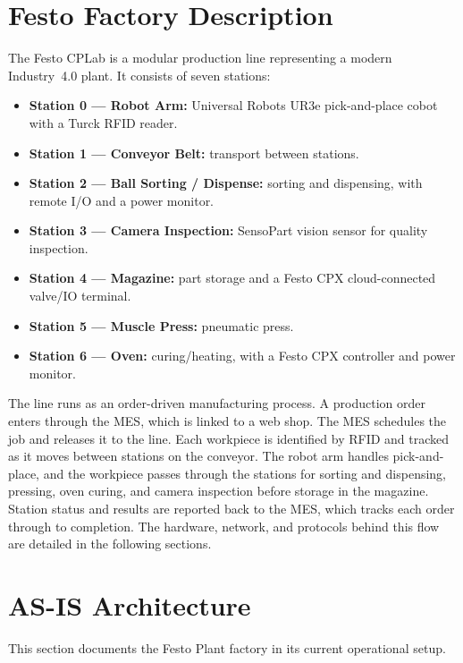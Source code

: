 \documentclass{report}
\begin{document}
\chapter{Festo Factory Description}\label{chap:2-description}

The Festo CPLab is a modular production line representing a modern Industry~4.0 plant. It consists of seven stations:

\begin{itemize}[nosep]
  \item \textbf{Station 0 --- Robot Arm:} Universal Robots UR3e pick-and-place cobot with a Turck RFID reader.
  \item \textbf{Station 1 --- Conveyor Belt:} transport between stations.
  \item \textbf{Station 2 --- Ball Sorting / Dispense:} sorting and dispensing, with remote I/O and a power monitor.
  \item \textbf{Station 3 --- Camera Inspection:} SensoPart vision sensor for quality inspection.
  \item \textbf{Station 4 --- Magazine:} part storage and a Festo CPX cloud-connected valve/IO terminal.
  \item \textbf{Station 5 --- Muscle Press:} pneumatic press.
  \item \textbf{Station 6 --- Oven:} curing/heating, with a Festo CPX controller and power monitor.
\end{itemize}

The line runs as an order-driven manufacturing process. A production order enters through the MES, which is linked to a web shop. The MES schedules the job and releases it to the line. Each workpiece is identified by RFID and tracked as it moves between stations on the conveyor. The robot arm handles pick-and-place, and the workpiece passes through the stations for sorting and dispensing, pressing, oven curing, and camera inspection before storage in the magazine. Station status and results are reported back to the MES, which tracks each order through to completion. The hardware, network, and protocols behind this flow are detailed in the following sections.

\chapter{AS-IS Architecture}\label{chap:3-currentarch}
This section documents the Festo Plant factory in its current operational setup.
\end{document}
